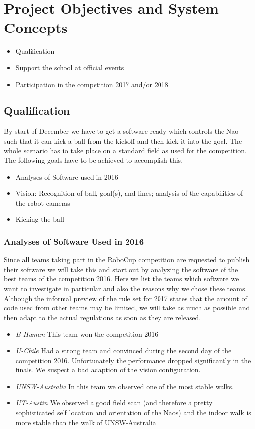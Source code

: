 \documentclass[12pt]{article}
\theoremstyle{definition}
\begin{document}
\section{Project Objectives and System Concepts}
\begin{itemize}
	\item Qualification
	\item Support the school at official events 
	\item Participation in the competition 2017 and/or 2018
\end{itemize}


\subsection{Qualification}
By start of December we have to get a software ready which controls the Nao such that it can kick a ball from the kickoff and then kick it into the goal. The whole scenario has to take place on a standard field as used for the competition. The following goals have to be achieved to accomplish this.
\begin{itemize}
	\item Analyses of Software used in 2016
	\item Vision: Recognition of ball, goal(s), and lines; analysis of the capabilities of the robot cameras
	\item Kicking the ball
\end{itemize}

\subsubsection{Analyses of Software Used in 2016}
Since all teams taking part in the RoboCup competition are requested to publish their software we will take this and start out by analyzing the software of the best teams of the competition 2016. Here we list the teams which software we want to investigate in particular and also the reasons why we chose these teams. Although the informal preview of the rule set for 2017 states that the amount of code used from other teams may be limited, we will take as much as possible and then adapt to the actual regulations as soon as they are released.

\begin{itemize}
	\item {\em B-Human} This team won the competition 2016.
	\item {\em U-Chile} Had a strong team and convinced during the second day of the competition 2016. Unfortunately the performance dropped significantly in the finals. We suspect a bad adaption of the vision configuration.
	\item {\em UNSW-Australia} In this team we observed one of the most stable walks.
	\item {\em UT-Austin} We observed a  good field scan (and therefore a pretty sophisticated self location and orientation of the Naos) and the indoor walk is more stable than the walk of UNSW-Australia
\end{itemize}
\end{document}
